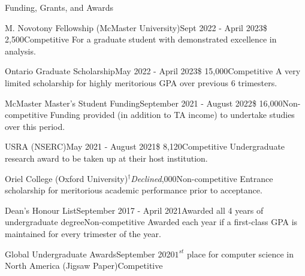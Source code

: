 \begin{rSection}{Funding, Grants, and Awards} 

\begin{aSubsection}{M. Novotony Fellowship (McMaster University)}{Sept 2022 - April 2023}{\$ 2,500}{Competitive}
For a graduate student with demonstrated excellence in analysis.\\
\end{aSubsection}

\begin{aSubsection}{Ontario Graduate Scholarship}{May 2022 - April 2023}{\$ 15,000}{Competitive}
A very limited scholarship for highly meritorious GPA over previous 6 trimesters.\\
\end{aSubsection}

\begin{aSubsection}{McMaster Master's Student Funding}{September 2021 - August 2022}{\$ 16,000}{Non-competitive}
Funding provided (in addition to TA income) to undertake studies over this period.\\
\end{aSubsection}

\begin{aSubsection}{USRA (NSERC)}{May 2021 - August 2021}{\$ 8,120}{Competitive}
Undergraduate research award to be taken up at their host institution.\\
\end{aSubsection}

\begin{aSubsection}{Oriel College (Oxford University)}{$^\dagger$\emph{Declined}}{,000}{Non-competitive}
Entrance scholarship for meritorious academic performance prior to acceptance.\\
\end{aSubsection}

\begin{aSubsection}{Dean's Honour List}{September 2017 - April 2021}{Awarded all 4 years of undergraduate degree}{Non-competitive}
Awarded each year if a first-class GPA is maintained for every trimester of the year.\\
\end{aSubsection}

\begin{aSubsection}{Global Undergraduate Awards}{September 2020}{$1^{st}$ place for computer science in North America (Jigsaw Paper)}{Competitive}


\end{aSubsection}
\end{rSection}
